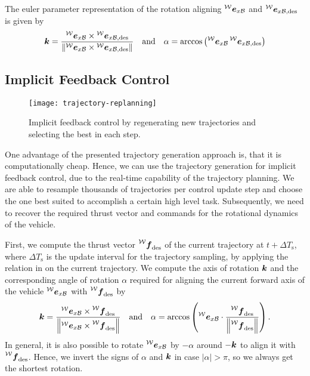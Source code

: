 The euler parameter representation of the rotation aligning $\prescript{\mathcal{W}}{}{\mbox{$\bm{e}$}}_{x\mathcal{B}}$ and $\prescript{\mathcal{W}}{}{\mbox{$\bm{e}$}}_{x\mathcal{B},\text{des}}$ is given by
\begin{equation}
	\mbox{$\bm{k}$} = \frac{
		\prescript{\mathcal{W}}{}{\mbox{$\bm{e}$}}_{x\mathcal{B}} \times \prescript{\mathcal{W}}{}{\mbox{$\bm{e}$}}_{x\mathcal{B},\text{des}}
	}{
		\left\lVert
			\prescript{\mathcal{W}}{}{\mbox{$\bm{e}$}}_{x\mathcal{B}} \times \prescript{\mathcal{W}}{}{\mbox{$\bm{e}$}}_{x\mathcal{B},\text{des}}
		\right\rVert
	}
	\quad \text{and} \quad
	\alpha = \arccos\left(\prescript{\mathcal{W}}{}{\mbox{$\bm{e}$}}_{x\mathcal{B}} \prescript{\mathcal{W}}{}{\mbox{$\bm{e}$}}_{x\mathcal{B},\text{des}}\right)
\end{equation}

\subsection{Implicit Feedback Control}
\label{sec:implicit-feedback-control}

\begin{figure}[h!]
	\centering
	\texttt{[image: trajectory-replanning]}
	\caption{Implicit feedback control by regenerating new trajectories and selecting the best in each step.}
\end{figure}

One advantage of the presented trajectory generation approach is, that it is computationally cheap. Hence, we can use the trajectory generation for implicit feedback control, due to the real-time capability of the trajectory planning. We are able to resample thousands of trajectories per control update step and choose the one best suited to accomplish a certain high level task.
Subsequently, we need to recover the required thrust vector and commands for the rotational dynamics of the vehicle.

First, we compute the thrust vector $\thrustdesiredworld$ of the current trajectory at $t+\Delta T_\text{s}$, where $\Delta T_{\text{s}}$ is the update interval for the trajectory sampling, by applying the relation in  on the current trajectory.
We compute the axis of rotation $\mbox{$\bm{k}$}$ and the corresponding angle of rotation $\alpha$ required for aligning the current forward axis of the vehicle $\prescript{\mathcal{W}}{}{\mbox{$\bm{e}$}}_{x\mathcal{B}}$ with $\thrustdesiredworld$ by
\begin{equation}
	\label{eq:rotation-to-desired-thrust-vector}
	\kb = \frac{
		\exbodyinworld \times \thrustdesiredworld
	}{
		\left\lVert
			\exbodyinworld \times \thrustdesiredworld
		\right\rVert}
	\quad
	\text{and}
	\quad
	\alpha = \arccos\left(
		\exbodyinworld \cdot
		\frac{\thrustdesiredworld}{\left\lVert\thrustdesiredworld\right\rVert}
	\right)
	.
\end{equation}
In general, it is also possible to rotate $\prescript{\mathcal{W}}{}{\mbox{$\bm{e}$}}_{x\mathcal{B}}$ by $-\alpha$ around $-\mbox{$\bm{k}$}$ to align it with $\thrustdesiredworld$. Hence, we invert the signs of $\alpha$ and $\mbox{$\bm{k}$}$ in case $\lvert\alpha\rvert > \pi$, so we always get the shortest rotation. 

